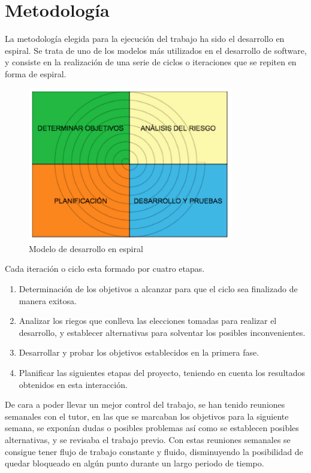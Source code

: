 \section{Metodología}
La metodología elegida para la ejecución del trabajo ha sido el desarrollo en espiral. Se trata de uno de los modelos más utilizados en el desarrollo de software, y consiste en la realización de una serie de ciclos o iteraciones que se repiten en forma de espiral.
\begin{figure}[H]
  \begin{center}
    \includegraphics[width=0.8\textwidth]{figures/desarrolloespiral.png}
		\caption{Modelo de desarrollo en espiral}
		\label{fig.desarrolloespiral}
		\end{center}
\end{figure}
Cada iteración o ciclo esta formado por cuatro etapas.
\begin{enumerate}
\item Determinación de los objetivos a alcanzar para que el ciclo sea finalizado de manera exitosa.
\item Analizar los riegos que conlleva las elecciones tomadas para realizar el desarrollo, y establecer alternativas para solventar los posibles inconvenientes.
\item Desarrollar y probar los objetivos establecidos en la primera fase.
\item Planificar las siguientes etapas del proyecto, teniendo en cuenta los resultados obtenidos en esta interacción.
\end{enumerate}
De cara a poder llevar un mejor control del trabajo, se han tenido reuniones semanales con el tutor, en las que se marcaban los objetivos para la siguiente semana, se exponían dudas o posibles problemas  así como se establecen posibles alternativas, y se revisaba el trabajo previo. Con estas reuniones semanales se consigue tener flujo de trabajo constante y fluido, disminuyendo la posibilidad de quedar bloqueado en algún punto durante un largo periodo de tiempo.

